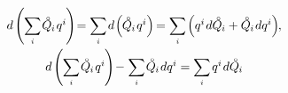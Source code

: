 \begin{otherlanguage}{russian}
\nopagebreak\vspace{-0.2em}\begin{equation*}
\begin{array}{c}\small
d \hspace{-0.1ex} \left( \hspace{-0.1ex} \scalebox{0.95}[1]{$\displaystyle \sum_{\smash{i}}$} \hspace{.2ex} \mathcircabove{Q}_{\hspace{-0.1ex}i} \hspace{.2ex} q^i \hspace{-0.12ex} \right) \hspace{-0.5ex}
= \scalebox{0.95}[1]{$\displaystyle \sum_{\smash{i}}$} \hspace{.25ex} d \hspace{-0.25ex} \left( \hspace{-0.1ex} \mathcircabove{Q}_{\hspace{-0.1ex}i} \hspace{.2ex} q^i \right) \hspace{-0.3ex}
= \scalebox{0.95}[1]{$\displaystyle \sum_{\smash{i}}$} \hspace{-0.16ex} \left(
q^i \hspace{.2ex} d \mathcircabove{Q}_{\hspace{-0.1ex}i}
+ \mathcircabove{Q}_{\hspace{-0.1ex}i} \hspace{.2ex} dq^i \right)
\hspace{-0.64ex} ,
\\[1.25em]
%
\small
d \hspace{-0.1ex} \left( \hspace{-0.1ex} \scalebox{0.95}[1]{$\displaystyle \sum_{\smash{i}}$} \hspace{.2ex} \mathcircabove{Q}_{\hspace{-0.1ex}i} \hspace{.2ex} q^i \hspace{-0.12ex} \right) \hspace{-0.4ex}
- \hspace{.1ex} \tikzmark{beginLegendreOfPotential} \scalebox{0.95}[1]{$\displaystyle \sum_{\smash{i}}$} \hspace{.2ex} \mathcircabove{Q}_{\hspace{-0.1ex}i} \hspace{.2ex} dq^i \tikzmark{endLegendreOfPotential}
= \scalebox{0.95}[1]{$\displaystyle \sum_{\smash{i}}$} \hspace{.32ex} q^i \hspace{.2ex} d\mathcircabove{Q}_{\hspace{-0.1ex}i}

\end{array}
\end{equation*}
\end{otherlanguage}
